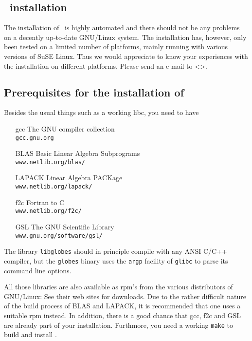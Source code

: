 
\begin{appendix}

\chapter{\GLOBES\ installation}
\label{app:installation}


The installation of \GLOBES\ is highly automated and there should not be
any problems on a decently up-to-date GNU/Linux system. The installation
has, however, only been tested on a limited number of platforms, mainly
running with various versions of SuSE Linux. Thus we would appreciate
to know your experiences with the installation on different platforms.
Please send an e-mail to <\bugs>.

\section*{Prerequisites for the installation of \GLOBES}

Besides the usual things such as a working libc, you need to have
\begin{itemize}
\item[gcc] The GNU compiler collection\\
\verb+gcc.gnu.org+
\item[BLAS] Basic Linear Algebra Subprograms\\
\verb+www.netlib.org/blas/+    
\item[LAPACK] Linear Algebra PACKage\\
\verb+www.netlib.org/lapack/+
\item[f2c] Fortran to C\\ 
\verb+www.netlib.org/f2c/+
\item[GSL] The GNU Scientific Library\\
\verb+www.gnu.org/software/gsl/+
\end{itemize}
The library \verb+libglobes+ should in principle compile with any
ANSI C/C++ compiler, but the \verb+globes+ binary uses the 
\verb+argp+ facility of \verb+glibc+ to parse its command line options.

All those libraries are also available as rpm's from the various
distributors of GNU/Linux: See their web sites for downloads. Due to
the rather difficult nature of the build process of BLAS and LAPACK,
it is recommended that one uses a suitable rpm instead. In addition,
there is a good chance that
gcc, f2c and GSL are already part of your installation. Furthmore, you need
a working \verb+make+ to build and install \GLOBES.


\end{appendix}
